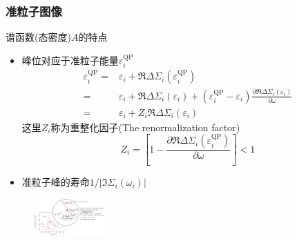 \documentclass[cjk,slidestop,compress,mathserif,blue]{beamer}
\begin{document}
\frame
{
	\frametitle{准粒子图像}
	谱函数(态密度)$A$的特点
	\begin{itemize}
		\item 峰位对应于准粒子能量$\varepsilon_i^{\mathrm{QP}}$
			\begin{displaymath}
				\begin{aligned}
					\varepsilon_i^{\mathrm{QP}}=&\varepsilon_i+\Re\Delta\Sigma_i(\varepsilon_i^{\mathrm{QP}})\\
					=&\varepsilon_i+\Re\Delta\Sigma_i(\varepsilon_i)+(\varepsilon_i^{\mathrm{QP}}-\varepsilon_i)\frac{\partial\Re\Delta\Sigma_i(\varepsilon_i)}{\partial\omega}\\
					=&\varepsilon_i+Z_i\Re\Delta\Sigma_i(\varepsilon_i)
				\end{aligned}
			\end{displaymath}
		这里$Z_i$称为重整化因子(\textrm{The renormalization factor})
			\begin{displaymath}
				Z_i=\left[ 1-\frac{\partial\Re\Delta\Sigma_i(\varepsilon_i^{\mathrm{QP}})}{\partial\omega} \right]<1
			\end{displaymath}
		\item 准粒子峰的寿命$1/|\Im\Sigma_i(\omega_i)|$
	\end{itemize}
\begin{figure}[h!]
\centering
\vspace*{-0.1in}
\includegraphics[height=0.55in,width=1.1in,viewport=0 0 1400 720,clip]{Figures/GWA_perturbation.png}
\caption{\fontsize{7.5pt}{6.2pt}}%
\label{GWA_perturbation}
\end{figure} 
}
\end{document}
